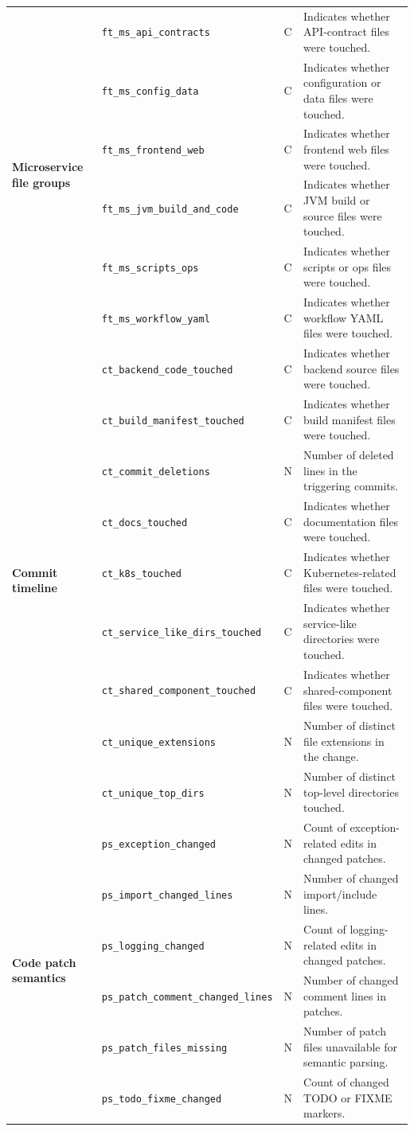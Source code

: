 \documentclass[conference]{IEEEconf}
\begin{document}
\begin{table}[!tp]
\begin{tabular}{p{2.6cm}p{5.3cm}p{0.8cm}p{7.2cm}}
\multirow{6}{*}{\textbf{Microservice file groups}}
& \texttt{ft\_ms\_api\_contracts} & C & Indicates whether API-contract files were touched. \\
& \texttt{ft\_ms\_config\_data} & C & Indicates whether configuration or data files were touched. \\
& \texttt{ft\_ms\_frontend\_web} & C & Indicates whether frontend web files were touched. \\
& \texttt{ft\_ms\_jvm\_build\_and\_code} & C & Indicates whether JVM build or source files were touched. \\
& \texttt{ft\_ms\_scripts\_ops} & C & Indicates whether scripts or ops files were touched. \\
& \texttt{ft\_ms\_workflow\_yaml} & C & Indicates whether workflow YAML files were touched. \\
\midrule

\multirow{9}{*}{\textbf{Commit timeline}}
& \texttt{ct\_backend\_code\_touched} & C & Indicates whether backend source files were touched. \\
& \texttt{ct\_build\_manifest\_touched} & C & Indicates whether build manifest files were touched. \\
& \texttt{ct\_commit\_deletions} & N & Number of deleted lines in the triggering commits. \\
& \texttt{ct\_docs\_touched} & C & Indicates whether documentation files were touched. \\
& \texttt{ct\_k8s\_touched} & C & Indicates whether Kubernetes-related files were touched. \\
& \texttt{ct\_service\_like\_dirs\_touched} & C & Indicates whether service-like directories were touched. \\
& \texttt{ct\_shared\_component\_touched} & C & Indicates whether shared-component files were touched. \\
& \texttt{ct\_unique\_extensions} & N & Number of distinct file extensions in the change. \\
& \texttt{ct\_unique\_top\_dirs} & N & Number of distinct top-level directories touched. \\
\midrule

\multirow{6}{*}{\textbf{Code patch semantics}}
& \texttt{ps\_exception\_changed} & N & Count of exception-related edits in changed patches. \\
& \texttt{ps\_import\_changed\_lines} & N & Number of changed import/include lines. \\
& \texttt{ps\_logging\_changed} & N & Count of logging-related edits in changed patches. \\
& \texttt{ps\_patch\_comment\_changed\_lines} & N & Number of changed comment lines in patches. \\
& \texttt{ps\_patch\_files\_missing} & N & Number of patch files unavailable for semantic parsing. \\
& \texttt{ps\_todo\_fixme\_changed} & N & Count of changed TODO or FIXME markers. \\
\midrule


\end{tabular}
\end{table}
\end{document}
